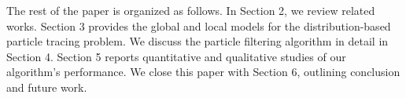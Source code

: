 \documentclass[review]{vgtc}                 %
\begin{document}
The rest of the paper is organized as follows. In Section 2, we review related works. Section 3 provides the global and local models for the distribution-based particle tracing problem. We discuss the particle filtering algorithm in detail in Section 4. Section 5 reports quantitative and qualitative studies of our algorithm's performance. We close this paper with Section 6, outlining conclusion and future work.














\end{document}
